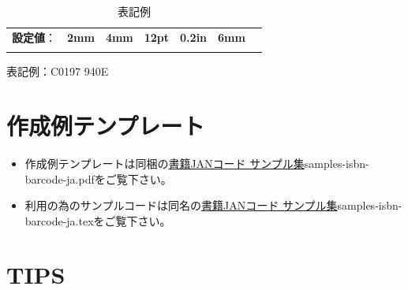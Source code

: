 \documentclass[a4paper,10pt,titlepage,pdfusetitle]{ltjsarticle}
\def\bf#1{\textbf{#1}}
\begin{document}
{\begin{itemize}
\begin{enumerate}
\begin{table}[h]
\begin{center}
\begin{tabular}{lllllll}
\hspace{-6pt}\bf{設定値}： & \bf{2mm} & \bf{4mm} & \bf{12pt} & \bf{0.2in} & \bf{6mm}\\
 & \hspace{10pt} & 
\hspace{8pt} & 
\hspace{6pt} & 
\hspace{6pt} & 
\hspace{4pt}\\
\hline
\end{tabular}
\caption{表記例}
\end{center}
\end{table}
\vspace{-4mm}
表記例：{C0197 \hspace{1pt}940E}  

\end{enumerate}
\end{itemize}

\section{作成例テンプレート}
\begin{itemize}
  \item 作成例テンプレートは同梱の\href{samples-isbn-barcode-ja.pdf}{書籍JANコード サンプル集}samples-isbn-barcode-ja.pdfをご覧下さい。
  \item 利用の為のサンプルコードは同名の\href{samples-isbn-barcode-ja.tex}{書籍JANコード サンプル集}samples-isbn-barcode-ja.texをご覧下さい。
  
\end{itemize}

\newpage

\section{TIPS}

}
\end{document}
